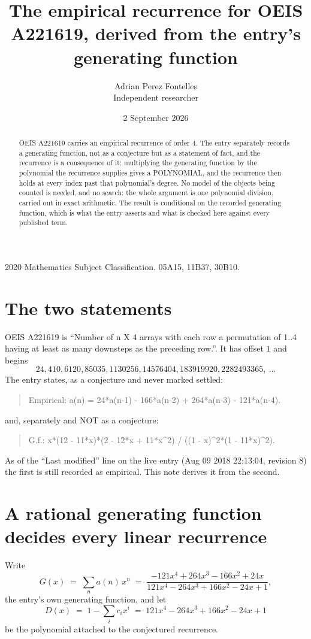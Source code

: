 \documentclass[11pt,a4paper]{article}
\title{The empirical recurrence for OEIS A221619, derived from the entry's generating function}
\author{Adrian Perez Fontelles\\ \small Independent researcher}
\date{2 September 2026}
\theoremstyle{plain}
\theoremstyle{definition}
\begin{document}
\maketitle

\begin{abstract}
OEIS A221619 carries an empirical recurrence of order $4$. The entry separately records a
generating function, not as a conjecture but as a statement of fact, and the recurrence is a
consequence of it: multiplying the generating function by the polynomial the recurrence
supplies gives a POLYNOMIAL, and the recurrence then holds at every index past that
polynomial's degree. No model of the objects being counted is needed, and no search: the
whole argument is one polynomial division, carried out in exact arithmetic. The result is
conditional on the recorded generating function, which is what the entry asserts and what is
checked here against every published term.
\end{abstract}

\noindent\small 2020 Mathematics Subject Classification. 05A15, 11B37, 30B10.\normalsize

\section{The two statements}

OEIS A221619 is ``Number of n X 4 arrays with each row a permutation of 1..4 having at least as many downsteps as the preceding row.''. It has offset $1$ and begins
\[
24, 410, 6120, 85035, 1130256, 14576404, 183919920, 2282493365,\ \dots
\]
The entry states, as a conjecture and never marked settled:
\begin{quote}
Empirical: a(n) = 24*a(n-1) - 166*a(n-2) + 264*a(n-3) - 121*a(n-4).
\end{quote}
and, separately and NOT as a conjecture:
\begin{quote}
G.f.: x*(12 - 11*x)*(2 - 12*x + 11*x\^{}2) / ((1 - x)\^{}2*(1 - 11*x)\^{}2).
\end{quote}
As of the ``Last modified'' line on the live entry (Aug 09 2018 22:13:04, revision 8) the first is still
recorded as empirical. This note derives it from the second.

\section{A rational generating function decides every linear recurrence}

Write
\[
G(x)\;=\;\sum_{n}a(n)\,x^{n}\;=\;\frac{- 121 x^{4} + 264 x^{3} - 166 x^{2} + 24 x}{121 x^{4} - 264 x^{3} + 166 x^{2} - 24 x + 1},
\]
the entry's own generating function, and let
\[
D(x)\;=\;1-\sum_i c_i x^{i}\;=\;121 x^{4} - 264 x^{3} + 166 x^{2} - 24 x + 1
\]
be the polynomial attached to the conjectured recurrence.
\end{document}
